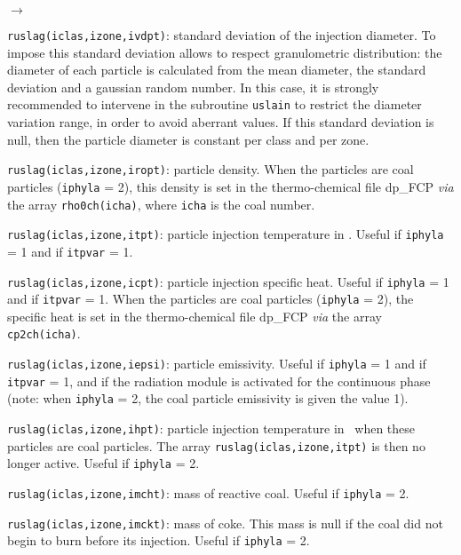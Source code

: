 {{{{\begin{list}{$\rightarrow$}{}
\item \texttt{ruslag(iclas,izone,ivdpt)}: standard deviation of the injection
      diameter. To impose this standard deviation allows to respect
      granulometric distribution: the diameter of each particle is
      calculated from the mean diameter, the standard deviation and a
      gaussian random number. In this case, it is strongly recommended
      to intervene in the subroutine \texttt{uslain} to
      restrict the diameter variation range, in order to avoid
      aberrant values. If this standard deviation is null, then the
      particle diameter is constant per class and per zone.

\item \texttt{ruslag(iclas,izone,iropt)}: particle density. When the particles
      are coal particles (\texttt{iphyla} = 2), this density is set in the
      thermo-chemical file dp\_FCP {\em via} the array \texttt{rho0ch(icha)},
      where \texttt{icha} is the coal number.

\item \texttt{ruslag(iclas,izone,itpt)}: particle injection temperature in
      \degresC. Useful if \texttt{iphyla} = 1 and if \texttt{itpvar} = 1.

\item \texttt{ruslag(iclas,izone,icpt)}: particle injection specific heat. Useful
      if \texttt{iphyla} = 1 and if \texttt{itpvar} = 1. When the particles are coal
      particles (\texttt{iphyla} = 2), the specific heat is set in the
      thermo-chemical file dp\_FCP {\em via} the array \texttt{cp2ch(icha)}.

\item \texttt{ruslag(iclas,izone,iepsi)}: particle emissivity. Useful if
      \texttt{iphyla} = 1 and if \texttt{itpvar} = 1, and if the radiation
      module is activated for the continuous phase (note: when \texttt{iphyla} = 2,
      the coal particle emissivity is given the value 1).

\item \texttt{ruslag(iclas,izone,ihpt)}: particle injection temperature in
      \degresC\ when these particles are coal
      particles. The array \texttt{ruslag(iclas,izone,itpt)} is then no longer
      active. Useful if \texttt{iphyla} = 2.

\item \texttt{ruslag(iclas,izone,imcht)}: mass of reactive coal. Useful if \texttt{iphyla} = 2.

\item \texttt{ruslag(iclas,izone,imckt)}:  mass of coke. This mass is null
      if the coal did not begin to burn before its injection. Useful if
      \texttt{iphyla} = 2.


\end{list}}}}}
